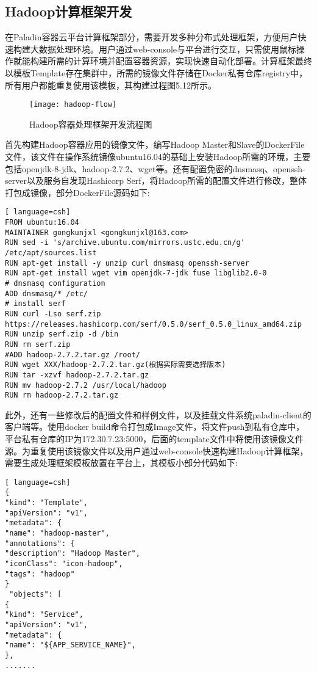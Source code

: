 \subsection{Hadoop计算框架开发}
在Paladin容器云平台计算框架部分，需要开发多种分布式处理框架，方便用户快速构建大数据处理环境。用户通过web-console与平台进行交互，只需使用鼠标操作就能构建所需的计算环境并配置容器资源，实现快速自动化部署。计算框架最终以模板Template存在集群中，所需的镜像文件存储在Docker私有仓库registry中，所有用户都能重复使用该模板，其构建过程图5.12所示。
\begin{figure}[H] %
	\centering
	\texttt{[image: hadoop-flow]}
	\caption{Hadoop容器处理框架开发流程图}
\end{figure}

首先构建Hadoop容器应用的镜像文件，编写Hadoop Master和Slave的DockerFile文件，该文件在操作系统镜像ubuntu16.04的基础上安装Hadoop所需的环境，主要包括openjdk-8-jdk、hadoop-2.7.2、wget等。还有配置免密的dnsmasq、openssh-server以及服务自发现Hashicorp Serf，将Hadoop所需的配置文件进行修改，整体打包成镜像，部分DockerFile源码如下:
\begin{lstlisting}[ language=csh]
FROM ubuntu:16.04
MAINTAINER gongkunjxl <gongkunjxl@163.com>
RUN sed -i 's/archive.ubuntu.com/mirrors.ustc.edu.cn/g' /etc/apt/sources.list
RUN apt-get install -y unzip curl dnsmasq openssh-server
RUN apt-get install wget vim openjdk-7-jdk fuse libglib2.0-0
# dnsmasq configuration
ADD dnsmasq/* /etc/
# install serf
RUN curl -Lso serf.zip https://releases.hashicorp.com/serf/0.5.0/serf_0.5.0_linux_amd64.zip
RUN unzip serf.zip -d /bin 
RUN rm serf.zip
#ADD hadoop-2.7.2.tar.gz /root/
RUN wget XXX/hadoop-2.7.2.tar.gz(根据实际需要选择版本)
RUN tar -xzvf hadoop-2.7.2.tar.gz
RUN mv hadoop-2.7.2 /usr/local/hadoop
RUN rm hadoop-2.7.2.tar.gz
\end{lstlisting}

此外，还有一些修改后的配置文件和样例文件，以及挂载文件系统paladin-client的客户端等。使用docker build命令打包成Image文件，将文件push到私有仓库中，平台私有仓库的IP为172.30.7.23:5000，后面的template文件中将使用该镜像文件源。为重复使用该镜像文件以及用户通过web-console快速构建Hadoop计算框架，需要生成处理框架模板放置在平台上，其模板小部分代码如下:
\begin{lstlisting}[ language=csh]
{
"kind": "Template",
"apiVersion": "v1",
"metadata": {
"name": "hadoop-master",
"annotations": {
"description": "Hadoop Master",
"iconClass": "icon-hadoop",
"tags": "hadoop"
}
 "objects": [
{
"kind": "Service",
"apiVersion": "v1",
"metadata": {
"name": "${APP_SERVICE_NAME}",
},
.......
\end{lstlisting}

